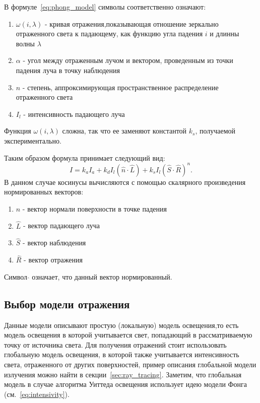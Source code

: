 В формуле~\ref{eq:phong_model} символы соответственно означают:
\begin{enumerate} 
	\item $\omega(i,\lambda)$ - кривая отражения,показывающая отношение зеркально отраженного света к падающему, как функцию угла падения $i$ и длинны волны $\lambda$
	\item $\alpha$ - угол между отраженным лучом и вектором, проведенным из точки падения луча в точку наблюдения 
	\item $n$ - степень, аппроксимирующая пространственное распределение отраженного света
	\item $I_l$ - интенсивность падающего луча
\end{enumerate}
Функция $\omega(i,\lambda)$ сложна, так что ее заменяют константой $k_s$, получаемой экспериментально.


Таким образом формула принимает следующий вид:
\begin{equation} 
	I = k_aI_a + k_dI_{l}(\hat{n} \cdot \hat{L}) + k_s  I_{l}(\hat{S} \cdot \hat{R})^n.
\end{equation}
В данном случае косинусы вычисляются с помощью скалярного произведения нормированных векторов:
\begin{enumerate}
	\item $\hat{n}$ - вектор нормали поверхности в точке падения
	\item $\hat{L}$ - вектор падающего луча
	\item $\hat{S}$ - вектор наблюдения
	\item $\hat{R}$ - вектор отражения
\end{enumerate}
Символ $\hat{}$ означает, что данный вектор нормированный.\cite{Rodgers}




\subsection{Выбор модели отражения}
Данные модели описывают простую (локальную) модель освещения,то есть модель освещения в которой учитывается свет, попадающий в рассматриваемую точку от источника света.
Для получения отражений стоит использовать глобальную модель освещения, в которой также учитывается интенсивность света, отраженного от других поверхностей, пример описания глобальной модели излучения можно найти в секции~\ref{sec:ray_tracing}.
Заметим, что глобальная модель в случае алгоритма Уиттеда освещения использует идею модели Фонга (см.~\ref{eq:intensivity}).


